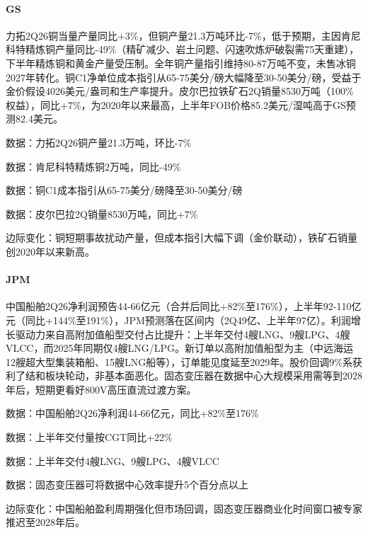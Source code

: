 \documentclass[11pt]{ctexart}
\begin{document}
\paragraph{GS} 力拓2Q26铜当量产量同比+3\%，但铜产量21.3万吨环比-7\%，低于预期，主因肯尼科特精炼铜产量同比-49\%（精矿减少、岩土问题、闪速吹炼炉破裂需75天重建），下半年精炼铜和黄金产量受压制。全年铜产量指引维持80-87万吨不变，未售冰铜2027年转化。铜C1净单位成本指引从65-75美分/磅大幅降至30-50美分/磅，受益于金价假设4026美元/盎司和生产率提升。皮尔巴拉铁矿石2Q销量8530万吨（100\%权益），同比+7\%，为2020年以来最高，上半年FOB价格85.2美元/湿吨高于GS预测82.4美元。
{\small\color{refgray}数据：力拓2Q26铜产量21.3万吨，环比-7\%\par}
{\small\color{refgray}数据：肯尼科特精炼铜2万吨，同比-49\%\par}
{\small\color{refgray}数据：铜C1成本指引从65-75美分/磅降至30-50美分/磅\par}
{\small\color{refgray}数据：皮尔巴拉2Q销量8530万吨，同比+7\%\par}
{\small\color{refgray}边际变化：铜短期事故扰动产量，但成本指引大幅下调（金价联动），铁矿石销量创2020年以来新高。\par}
\paragraph{JPM} 中国船舶2Q26净利润预告44-66亿元（合并后同比+82\%至176\%），上半年92-110亿元（同比+144\%至191\%），JPM预测落在区间内（2Q49亿、上半年97亿）。利润增长驱动力来自高附加值船型交付占比提升：上半年交付4艘LNG、9艘LPG、4艘VLCC，而2025年同期仅4艘LNG/LPG。新订单以高附加值船型为主（中远海运12艘超大型集装箱船、15艘LNG船等），订单能见度延至2029年。股价回调9\%系获利了结和板块轮动，非基本面恶化。固态变压器在数据中心大规模采用需等到2028年后，短期更看好800V高压直流过渡方案。
{\small\color{refgray}数据：中国船舶2Q26净利润44-66亿元，同比+82\%至176\%\par}
{\small\color{refgray}数据：上半年交付量按CGT同比+22\%\par}
{\small\color{refgray}数据：上半年交付4艘LNG、9艘LPG、4艘VLCC\par}
{\small\color{refgray}数据：固态变压器可将数据中心效率提升5个百分点以上\par}
{\small\color{refgray}边际变化：中国船舶盈利周期强化但市场回调，固态变压器商业化时间窗口被专家推迟至2028年后。\par}
\end{document}

